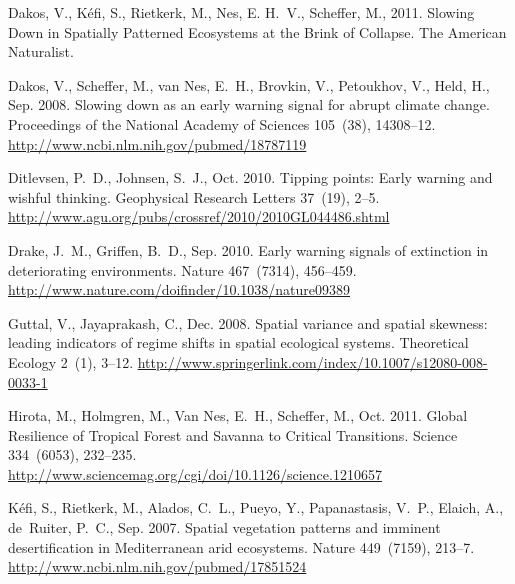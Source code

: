 \documentclass[authoryear,review,12pt]{elsarticle}
\begin{document}
\begin{thebibliography}{24}
Dakos, V., K\'{e}fi, S., Rietkerk, M., Nes, E. H.~V., Scheffer, M., 2011.
  {Slowing Down in Spatially Patterned Ecosystems at the Brink of Collapse}.
  The American Naturalist.

Dakos, V., Scheffer, M., van Nes, E.~H., Brovkin, V., Petoukhov, V., Held, H.,
  Sep. 2008. {Slowing down as an early warning signal for abrupt climate
  change.} Proceedings of the National Academy of Sciences 105~(38), 14308--12.
\newline\urlprefix\url{http://www.ncbi.nlm.nih.gov/pubmed/18787119}

Ditlevsen, P.~D., Johnsen, S.~J., Oct. 2010. {Tipping points: Early warning and
  wishful thinking}. Geophysical Research Letters 37~(19), 2--5.
\newline\urlprefix\url{http://www.agu.org/pubs/crossref/2010/2010GL044486.shtml}

Drake, J.~M., Griffen, B.~D., Sep. 2010. {Early warning signals of extinction
  in deteriorating environments}. Nature 467~(7314), 456--459.
\newline\urlprefix\url{http://www.nature.com/doifinder/10.1038/nature09389}

Guttal, V., Jayaprakash, C., Dec. 2008. {Spatial variance and spatial skewness:
  leading indicators of regime shifts in spatial ecological systems}.
  Theoretical Ecology 2~(1), 3--12.
\newline\urlprefix\url{http://www.springerlink.com/index/10.1007/s12080-008-0033-1}

Hirota, M., Holmgren, M., {Van Nes}, E.~H., Scheffer, M., Oct. 2011. {Global
  Resilience of Tropical Forest and Savanna to Critical Transitions}. Science
  334~(6053), 232--235.
\newline\urlprefix\url{http://www.sciencemag.org/cgi/doi/10.1126/science.1210657}

K\'{e}fi, S., Rietkerk, M., Alados, C.~L., Pueyo, Y., Papanastasis, V.~P.,
  Elaich, A., de~Ruiter, P.~C., Sep. 2007. {Spatial vegetation patterns and
  imminent desertification in Mediterranean arid ecosystems.} Nature
  449~(7159), 213--7.
\newline\urlprefix\url{http://www.ncbi.nlm.nih.gov/pubmed/17851524}


\end{thebibliography}
\end{document}

